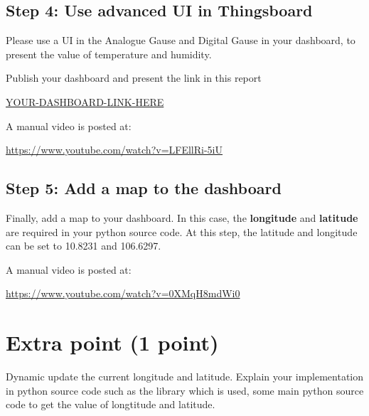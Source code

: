 \documentclass[a4paper,11pt]{article}
\theoremstyle{mytheor}
\begin{document}
\subsection{Step 4: Use advanced UI in Thingsboard}
Please use a UI in the Analogue Gause and Digital Gause in your dashboard, to present the value of temperature and humidity.

Publish your dashboard and present the link in this report
\begin{center}
    \url{YOUR-DASHBOARD-LINK-HERE}
\end{center}

A manual video is posted at:
\begin{center}
    \url{https://www.youtube.com/watch?v=LFEllRi-5iU}
\end{center}

\subsection{Step 5: Add a map to the dashboard}
Finally, add a map to your dashboard. In this case, the \textbf{longitude} and \textbf{latitude} are required in your python source code. At this step, the latitude and longitude can be set to 10.8231 and 106.6297.

A manual video is posted at:
\begin{center}
    \url{https://www.youtube.com/watch?v=0XMqH8mdWi0}
\end{center}

\section{Extra point (1 point)}
Dynamic update the current longitude and latitude. Explain your implementation in python source code such as the library which is used, some main python source code to get the value of longtitude and latitude.
\end{document}
